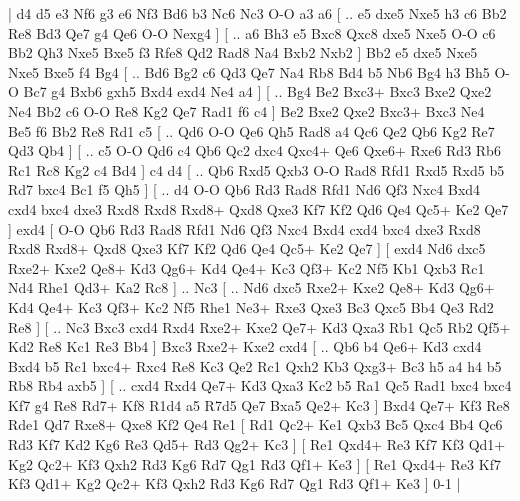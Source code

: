 \makegametitle 
|   d4   d5    e3   Nf6    g3  e6    Nf3   Bd6    b3   Nc6    Nc3   O-O    a3   a6 [ .. e5  dxe5 Nxe5  h3 c6  Bb2 Re8  Bd3 Qe7  g4 Qe6  O-O Nexg4   ]  [ .. a6  Bh3 e5  Bxc8 Qxc8  dxe5 Nxe5  O-O c6  Bb2 Qh3  Nxe5 Bxe5  f3 Rfe8  Qd2 Rad8  Na4 Bxb2  Nxb2   ]  Bb2   e5    dxe5   Nxe5    Nxe5   Bxe5    f4   Bg4 [ .. Bd6  Bg2 c6  Qd3 Qe7  Na4 Rb8  Bd4 b5  Nb6 Bg4  h3 Bh5  O-O Bc7  g4 Bxb6  gxh5 Bxd4  exd4 Ne4  a4   ]  [ .. Bg4  Be2 Bxc3+  Bxc3 Bxe2  Qxe2 Ne4  Bb2 c6  O-O Re8  Kg2 Qe7  Rad1 f6  c4   ]  Be2   Bxe2    Qxe2   Bxc3+    Bxc3   Ne4    Be5   f6    Bb2   Re8    Rd1   c5 [ .. Qd6  O-O Qe6  Qh5 Rad8  a4 Qc6  Qe2 Qb6  Kg2 Re7  Qd3 Qb4   ]  [ .. c5  O-O Qd6  c4 Qb6  Qc2 dxc4  Qxc4+ Qe6  Qxe6+ Rxe6  Rd3 Rb6  Rc1 Rc8  Kg2 c4  Bd4   ]  c4   d4 [ .. Qb6  Rxd5 Qxb3  O-O Rad8  Rfd1 Rxd5  Rxd5 b5  Rd7 bxc4  Bc1 f5  Qh5   ]  [ .. d4  O-O Qb6  Rd3 Rad8  Rfd1 Nd6  Qf3 Nxc4  Bxd4 cxd4  bxc4 dxe3  Rxd8 Rxd8  Rxd8+ Qxd8  Qxe3 Kf7  Kf2 Qd6  Qe4 Qc5+  Ke2 Qe7   ]  exd4 [  O-O Qb6  Rd3 Rad8  Rfd1 Nd6  Qf3 Nxc4  Bxd4 cxd4  bxc4 dxe3  Rxd8 Rxd8  Rxd8+ Qxd8  Qxe3 Kf7  Kf2 Qd6  Qe4 Qc5+  Ke2 Qe7   ]  [  exd4 Nd6  dxc5 Rxe2+  Kxe2 Qe8+  Kd3 Qg6+  Kd4 Qe4+  Kc3 Qf3+  Kc2 Nf5  Kb1 Qxb3  Rc1 Nd4  Rhe1 Qd3+  Ka2 Rc8   ] .. Nc3 [ .. Nd6  dxc5 Rxe2+  Kxe2 Qe8+  Kd3 Qg6+  Kd4 Qe4+  Kc3 Qf3+  Kc2 Nf5  Rhe1 Ne3+  Rxe3 Qxe3  Bc3 Qxc5  Bb4 Qe3  Rd2 Re8   ]  [ .. Nc3  Bxc3 cxd4  Rxd4 Rxe2+  Kxe2 Qe7+  Kd3 Qxa3  Rb1 Qc5  Rb2 Qf5+  Kd2 Re8  Kc1 Re3  Bb4   ]  Bxc3   Rxe2+    Kxe2   cxd4 [ .. Qb6  b4 Qe6+  Kd3 cxd4  Bxd4 b5  Rc1 bxc4+  Rxc4 Re8  Kc3 Qe2  Rc1 Qxh2  Kb3 Qxg3+  Bc3 h5  a4 h4  b5 Rb8  Rb4 axb5   ]  [ .. cxd4  Rxd4 Qe7+  Kd3 Qxa3  Kc2 b5  Ra1 Qc5  Rad1 bxc4  bxc4 Kf7  g4 Re8  Rd7+ Kf8  R1d4 a5  R7d5 Qe7  Bxa5 Qe2+  Kc3   ]  Bxd4   Qe7+    Kf3   Re8    Rde1   Qd7    Rxe8+   Qxe8    Kf2   Qe4    Re1 [  Rd1 Qc2+  Ke1 Qxb3  Bc5 Qxc4  Bb4 Qc6  Rd3 Kf7  Kd2 Kg6  Re3 Qd5+  Rd3 Qg2+  Kc3   ]  [  Re1 Qxd4+  Re3 Kf7  Kf3 Qd1+  Kg2 Qc2+  Kf3 Qxh2  Rd3 Kg6  Rd7 Qg1  Rd3 Qf1+  Ke3   ]  [  Re1 Qxd4+  Re3 Kf7  Kf3 Qd1+  Kg2 Qc2+  Kf3 Qxh2  Rd3 Kg6  Rd7 Qg1  Rd3 Qf1+  Ke3   ] 0-1  |

